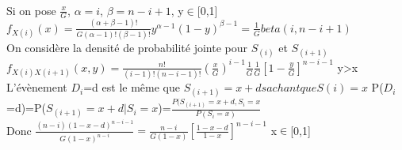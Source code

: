 \documentclass[11pt,a4paper]{article} %
\begin{document}
\\Si on pose $ \frac{x}{G}$, $\alpha=i$, $\beta=n-i+1$, y$\in$[0,1]                                                                                                                                                                                                                                                                                                                                                                                                                                                                                                                                                                                                                                                    \\ 
$f_{X(i)}(x)= \frac{(\alpha+\beta-1)!}{G(\alpha-1)!(\beta-1)!}y^{\alpha-1}(1-y)^{\beta-1}=\frac{1}{G}beta(i,n-i+1) $\\
On considère la densité de probabilité jointe pour $S_(i)$ et $S_{(i+1)}$\\
$f_{X(i)X(i+1)}(x,y) = \frac{n!}{(i-1)!(n-i-1)!} (\frac{x}{G})^{i-1} \frac{1}{G} \frac{1}{G}[1-\frac{y}{G}]^{n-i-1}$ y>x\\
L'évènement $D_i$=d est le même que $S_{(i+1)}=x+d sachant que S(i)=x$
P($D_i$=d)=P($S_{(i+1)}=x+d|S_i=x $)=$\frac{P(S_{(i+1)}=x+d,S_i=x}{P(S_i=x)} $\\
Donc $\frac{(n-i)(1-x-d)^{n-i-1}}{G(1-x)^{n-i}}=\frac{n-i}{G(1-x)}[\frac{1-x-d}{1-x}]^{n-i-1}$ x$\in$[0,1]                                                                                                                                                                                                                                                                                                                                                                                                                                                                                                                                                                                                                                                  
\end{document}
